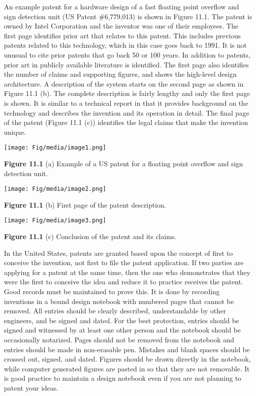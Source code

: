 An example patent for a hardware design of a fast floating point
overflow and sign detection unit (US Patent \#6,779,013) is shown in
Figure 11.1. The patent is owned by Intel Corporation and the inventor
was one of their employees. The first page identifies prior art that
relates to this patent. This includes previous patents related to this
technology, which in this case goes back to 1991. It is not unusual to
cite prior patents that go back 50 or 100 years. In addition to patents,
prior art in publicly available literature is identified. The first page
also identifies the number of claims and supporting figures, and shows
the high-level design architecture. A description of the system starts
on the second page as shown in Figure 11.1 (b). The complete description
is fairly lengthy and only the first page is shown. It is similar to a
technical report in that it provides background on the technology and
describes the invention and its operation in detail. The final page of
the patent (Figure 11.1 (c)) identifies the legal claims that make the
invention unique.

\texttt{[image: Fig/media/image1.png]}

\textbf{Figure 11.1} (a) Example of a US patent for a floating point
overflow and sign detection unit.

\texttt{[image: Fig/media/image2.png]}

\textbf{Figure 11.1} (b) First page of the patent description.

\texttt{[image: Fig/media/image3.png]}

\textbf{Figure 11.1} (c) Conclusion of the patent and its claims.

In the United States, patents are granted based upon the concept of
first to conceive the invention, not first to file the patent
application. If two parties are applying for a patent at the same time,
then the one who demonstrates that they were the first to conceive the
idea and reduce it to practice receives the patent. Good records must be
maintained to prove this. It is done by recording inventions in a bound
design notebook with numbered pages that cannot be removed. All entries
should be clearly described, understandable by other engineers, and be
signed and dated. For the best protection, entries should be signed and
witnessed by at least one other person and the notebook should be
occasionally notarized. Pages should not be removed from the notebook
and entries should be made in non-erasable pen. Mistakes and blank
spaces should be crossed out, signed, and dated. Figures should be drawn
directly in the notebook, while computer generated figures are pasted in
so that they are not removable. It is good practice to maintain a design
notebook even if you are not planning to patent your ideas.

